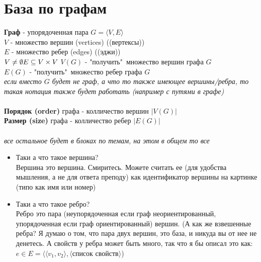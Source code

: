 \documentclass[../TM3-UltraDoc.tex]{subfiles}
\begin{document}
	\section*{База по графам}
	
	\textbf{Граф} - упорядоченная пара \(G = \langle V, E \rangle \)\\
	\(V\) - множество вершин (vertices) ((вертексы))\\
	\(E\) - множество ребер (edges) ((эджи)) \\
	\small
	\(
	\\
	V \neq \emptyset \\
	E \subseteq V \times V\\
	\\
	\)
	\normalsize
	\noindent
	\(V(G)\) - "получить"\ множество вершин графа $G$\\
	\(E(G)\) - "получить"\ множество ребер графа $G$\\
	\textit{если вместо $G$ будет не граф, а что то также имеющее вершины/ребра, то такая нотация также будет работать (например с путями в графе)}\\
	\\
	\textbf{Порядок (order)} графа - колличество вершин	$ |V(G)| $ \\
	\textbf{Размер (size)} графа - колличество ребер	$ |E(G)| $ \\
	\\
	\textit{все остальное будет в блоках по темам, на этом в общем то все}\\
	\small
	\begin{tcolorbox}[colframe=gray!50!black, left=5pt, right=5pt, top=5pt, bottom=5pt, boxrule=1pt, title=\textbf{Немножечко филосовских уточнений/рассуждений:}, colback=gray!10!white]
		\begin{itemize}
		\item Таки а что такое вершина?\\
		Вершина это вершина. Смиритесь. Можете считать ее (для удобства мышления, а не для ответа преподу) как идентификатор вершины на картинке (типо как имя или номер)
		\item Таки а что такое ребро?\\
		Ребро это пара (неупорядоченная если граф неориентированный, упорядоченная если граф ориентированный) вершин. (А как же взвешенные ребра? Я думаю о том, что пара двух вершин, это база, и никуда вы от нее не денетесь. А свойств у ребра может быть много, так что я бы описал это как:\\ 
		$e \in E = \langle \langle v_1, v_2 \rangle, \langle \text{список свойств} \rangle$)
		\end{itemize}
		
	\end{tcolorbox}
	\normalsize
		
\end{document}

